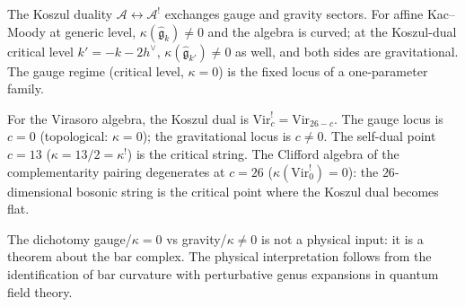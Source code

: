 \documentclass[11pt,reqno]{amsart}
\theoremstyle{definition}
\theoremstyle{remark}
\providecommand{\cA}{\mathcal{A}}
\providecommand{\fg}{\mathfrak{g}}
\providecommand{\Vir}{\mathrm{Vir}}
\numberwithin{equation}{section}
\begin{document}
The Koszul duality $\cA \leftrightarrow \cA^!$ exchanges
gauge and gravity sectors. For affine Kac--Moody at
generic level, $\kappa(\widehat{\fg}_k) \ne 0$ and the
algebra is curved; at the Koszul-dual critical level
$k' = -k - 2h^\vee$, $\kappa(\widehat{\fg}_{k'}) \ne 0$
as well, and both sides are gravitational. The gauge regime
(critical level, $\kappa = 0$) is the fixed locus of a
one-parameter family.

For the Virasoro algebra, the Koszul dual is
$\Vir_c^! = \Vir_{26-c}$. The gauge locus is $c = 0$
(topological: $\kappa = 0$); the gravitational locus is
$c \ne 0$. The self-dual point $c = 13$
($\kappa = 13/2 = \kappa^!$) is the critical string.
The Clifford algebra of the complementarity pairing
degenerates at $c = 26$ ($\kappa(\Vir_0^!) = 0$):
the $26$-dimensional bosonic string is the critical point
where the Koszul dual becomes flat.

The dichotomy gauge/$\kappa{=}0$ vs
gravity/$\kappa{\ne}0$ is not a physical input: it is a
theorem about the bar complex. The physical interpretation
follows from the identification of bar curvature with
perturbative genus expansions in quantum field theory.
\end{document}
